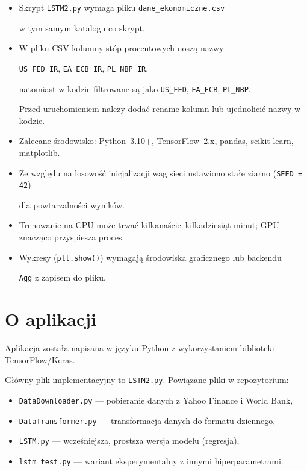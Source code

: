 \documentclass[12pt,a4paper]{report}
\begin{document}
\begin{itemize}

    \item Skrypt \texttt{LSTM2.py} wymaga pliku \texttt{dane\_ekonomiczne.csv}

          w tym samym katalogu co skrypt.

    \item W pliku CSV kolumny stóp procentowych noszą nazwy

          \texttt{US\_FED\_IR}, \texttt{EA\_ECB\_IR}, \texttt{PL\_NBP\_IR},

          natomiast w kodzie filtrowane są jako \texttt{US\_FED}, \texttt{EA\_ECB}, \texttt{PL\_NBP}.

          Przed uruchomieniem należy dodać rename kolumn lub ujednolicić nazwy w kodzie.

    \item Zalecane środowisko: Python~3.10+, TensorFlow~2.x, pandas, scikit-learn, matplotlib.

    \item Ze względu na losowość inicjalizacji wag sieci ustawiono stałe ziarno (\texttt{SEED = 42})

          dla powtarzalności wyników.

    \item Trenowanie na CPU może trwać kilkanaście--kilkadziesiąt minut; GPU znacząco przyspiesza proces.

    \item Wykresy (\texttt{plt.show()}) wymagają środowiska graficznego lub backendu

          \texttt{Agg} z zapisem do pliku.

\end{itemize}



\section{O aplikacji}



Aplikacja została napisana w języku Python z wykorzystaniem biblioteki TensorFlow/Keras.

Główny plik implementacyjny to \texttt{LSTM2.py}. Powiązane pliki w repozytorium:

\begin{itemize}

    \item \texttt{DataDownloader.py} --- pobieranie danych z Yahoo Finance i World Bank,

    \item \texttt{DataTransformer.py} --- transformacja danych do formatu dziennego,

    \item \texttt{LSTM.py} --- wcześniejsza, prostsza wersja modelu (regresja),

    \item \texttt{lstm\_test.py} --- wariant eksperymentalny z innymi hiperparametrami.

\end{itemize}
\end{document}
